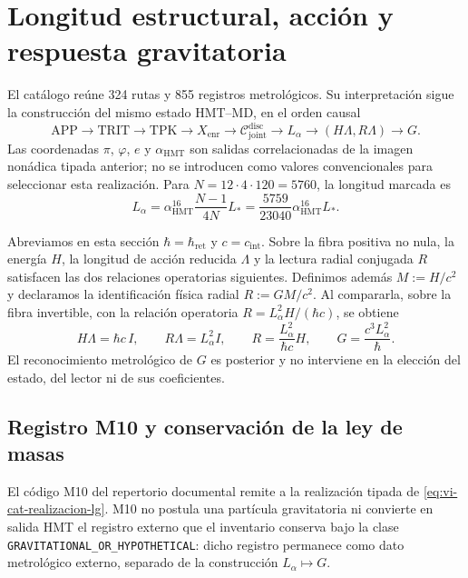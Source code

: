 \section{Longitud estructural, acci\'on y respuesta gravitatoria}
\label{sec:vi-catalogo-dependencia-l-g}

El cat\'alogo re\'une 324 rutas y 855 registros metrol\'ogicos. Su
interpretaci\'on sigue la construcci\'on del mismo estado HMT--MD, en el orden
causal
\[
 \mathrm{APP}\longrightarrow\mathrm{TRIT}\longrightarrow\mathrm{TPK}
 \longrightarrow X_{\mathrm{enr}}
 \longrightarrow\mathcal C^{\mathrm{disc}}_{\mathrm{joint}}
 \longrightarrow L_{\alpha}
 \longrightarrow(H\Lambda,R\Lambda)
 \longrightarrow G .
 \tag{A.1}\label{eq:vi-cat-cadena-lg}
\]
Las coordenadas \(\pi\), \(\varphi\), \(e\) y
\(\alpha_{\mathrm{HMT}}\) son salidas correlacionadas de la imagen non\'adica
tipada anterior; no se introducen como valores convencionales para seleccionar
esta realizaci\'on. Para \(N=12\cdot4\cdot120=5760\), la longitud marcada es
\[
 L_{\alpha}=\alpha_{\mathrm{HMT}}^{16}
 \frac{N-1}{4N}L_*
 =\frac{5759}{23040}\alpha_{\mathrm{HMT}}^{16}L_* .
 \tag{A.2}\label{eq:vi-cat-longitud-alpha}
\]

Abreviamos en esta secci\'on \(\hbar=\hbar_{\mathrm{ret}}\) y
\(c=c_{\mathrm{int}}\). Sobre la fibra positiva no nula, la energ\'ia
\(H\), la longitud de acci\'on reducida \(\Lambda\) y la lectura radial
conjugada \(R\) satisfacen las dos relaciones operatorias siguientes.
Definimos adem\'as \(M:=H/c^2\) y declaramos la identificaci\'on f\'isica
radial \(R:=GM/c^2\). Al compararla, sobre la fibra invertible, con la
relaci\'on operatoria \(R=L_{\alpha}^{2}H/(\hbar c)\), se obtiene
\[
 H\Lambda=\hbar c\,I,\qquad
 R\Lambda=L_{\alpha}^{2}I,\qquad
 R=\frac{L_{\alpha}^{2}}{\hbar c}H,\qquad
 \boxed{G=\frac{c^{3}L_{\alpha}^{2}}{\hbar}} .
 \tag{A.3}\label{eq:vi-cat-realizacion-lg}
\]
El reconocimiento metrol\'ogico de \(G\) es posterior y no interviene en la
elecci\'on del estado, del lector ni de sus coeficientes.

\subsection{Registro M10 y conservaci\'on de la ley de masas}
\label{sec:vi-catalogo-m10-activo}

El c\'odigo M10 del repertorio documental remite a la
realizaci\'on tipada de \eqref{eq:vi-cat-realizacion-lg}. M10 no postula una
part\'icula gravitatoria ni convierte en salida HMT el registro externo que el
inventario conserva bajo la clase
\texttt{GRAVITATIONAL\_OR\_HYPOTHETICAL}: dicho registro permanece como dato
metrol\'ogico externo, separado de la construcci\'on
\(L_{\alpha}\mapsto G\).

